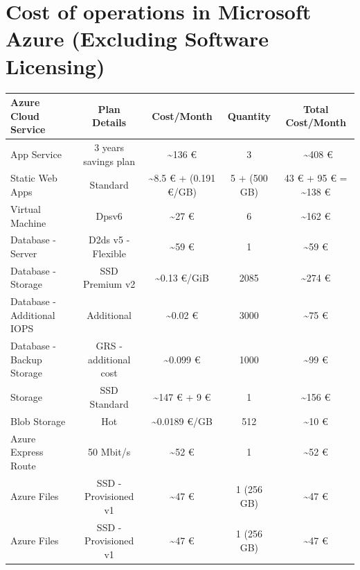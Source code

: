 \documentclass{llncs}
\begin{document}
\section{Cost of operations in Microsoft Azure (Excluding Software Licensing)}
\begin{table}[htbp]
    \centering
    \begin{tabular}{|l|c|c|c|c|}
        \hline
        \textbf{Azure Cloud Service} & \textbf{Plan Details}    & \textbf{Cost/Month}                & \textbf{Quantity} & \textbf{Total Cost/Month}           \\

        \hline
        App Service                  & 3 years savings plan  & \textasciitilde 136 €                & 3                 & ~\textasciitilde 408 €              \\
        \hline
        Static Web Apps              & Standard              & \textasciitilde 8.5 € + (0.191 €/GB) & 5 + (500 GB)      & 43 € + 95 € = \textasciitilde 138 € \\
        \hline
        Virtual Machine              & Dpsv6                 & \textasciitilde 27 €                 & 6                 & \textasciitilde 162 €               \\
        \hline
        Database - Server            & D2ds v5 - Flexible    & \textasciitilde 59 €            & 1              & \textasciitilde 59 €                          \\
        \hline
        Database - Storage           & SSD Premium v2         & \textasciitilde 0.13 €/GiB           & 2085              & \textasciitilde 274 €            \\
        \hline
        Database - Additional IOPS   &  Additional            &   \textasciitilde 0.02 €             & 3000                 & \textasciitilde 75 €         \\
        \hline
        Database - Backup Storage    & GRS - additional cost    & \textasciitilde 0.099 €         & 1000            & \textasciitilde 99 €                             \\
        \hline
        Storage                      & SSD Standard             & \textasciitilde 147 € + 9 €        & 1           & \textasciitilde 156 €                             \\
        \hline
        Blob Storage                 & Hot                      & \textasciitilde 0.0189 €/GB        & 512           & \textasciitilde 10 €                             \\
        \hline
        Azure Express Route          & 50 Mbit/s                 & \textasciitilde 52 €             & 1          & \textasciitilde 52 €                            \\
        \hline
        Azure Files                 & SSD - Provisioned v1       & \textasciitilde 47 €             & 1 (256 GB)         & \textasciitilde 47 €                            \\
        \hline
        Azure Files                 & SSD - Provisioned v1       & \textasciitilde 47 €             & 1 (256 GB)         & \textasciitilde 47 €                            \\
        \hline
   

\end{tabular}
\end{table}
\end{document}
